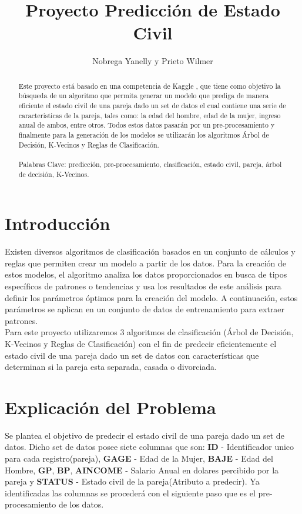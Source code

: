 \documentclass{sciposter}
\title{Proyecto Predicción de Estado Civil}
\author{Nobrega Yanelly y Prieto Wilmer}
\institute 
{Escuela de Computación\\
Facultad de Ciencias \\ 
Universidad Central de Venezuela (UCV)\\
  Av. Paseo Los Ilustres, Los Chaguaramos, Caracas, Venezuela}
\begin{document}

\maketitle

\begin{multicols}{3}

\begin{abstract}
Este proyecto está basado en una competencia de Kaggle \cite{KaggleMarriagePrediction}, que tiene como objetivo la búsqueda de un algoritmo que permita generar un modelo que prediga de manera eficiente el estado civil de una pareja dado un set de datos el cual contiene una serie de características de la pareja, tales como: la edad del hombre, edad de la mujer, ingreso anual de ambos, entre otros. Todos estos datos pasarán por un pre-procesamiento y finalmente para la generación de los modelos se utilizarán los algoritmos Árbol de Decisión, K-Vecinos y Reglas de Clasificación. 
\\ \\
Palabras Clave: predicción, pre-procesamiento, clasificación, estado civil, pareja, árbol de decisión, K-Vecinos.
\end{abstract}


\section{Introducción}
Existen diversos algoritmos de clasificación basados en un conjunto de cálculos y reglas que permiten crear un modelo a partir de los datos. Para la creación de estos modelos, el algoritmo analiza los datos proporcionados en busca de tipos específicos de patrones o tendencias y usa los resultados de este análisis para definir los parámetros óptimos para la creación del modelo. A continuación, estos parámetros se aplican en un conjunto de datos de entrenamiento para extraer patrones. 
\\
Para este proyecto utilizaremos 3 algoritmos de clasificación (Árbol de Decisión,  K-Vecinos y Reglas de Clasificación) con el fin de predecir eficientemente el estado civil de una pareja dado un set de datos con características que determinan si la pareja esta separada, casada o divorciada.
\\

\section{Explicación del Problema}
Se plantea el objetivo de predecir el estado civil de una pareja dado un set de datos. Dicho set de datos posee siete columnas que son: \textbf{ID} - Identificador unico para cada registro(pareja), \textbf{GAGE} - Edad de la Mujer, \textbf{BAJE} - Edad del Hombre, \textbf{GP}, \textbf{BP}, \textbf{AINCOME} - Salario Anual en dolares percibido por la pareja y \textbf{STATUS} - Estado civil de la pareja(Atributo a predecir). Ya identificadas las columnas se procederá con el siguiente paso que es el pre-procesamiento de los datos.
\\


\end{multicols}
\end{document}
